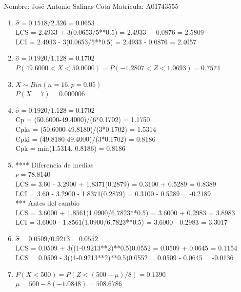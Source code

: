 \documentclass[8pt]{report}
\begin{document}
 \newpage

Nombre: \underline{\hspace*{.2in}}
José Antonio Salinas Cota
\underline{\hspace*{.2in}} \quad Matr\'icula:\underline{\hspace*{.2in}}
A01743555
\underline{\hspace*{.2in}} \\

\begin{enumerate}
\item $\hat\sigma = 0.1518/2.326 = 0.0653$\\
LCS = 2.4933 + 3(0.0653/5**0.5) = 2.4933 + 0.0876 = 2.5809\\
LCI = 2.4933 - 3(0.0653/5**0.5) = 2.4933 - 0.0876 = 2.4057
\item $\hat\sigma = 0.1920/1.128 = 0.1702$\\
$P(49.6000 < X < 50.0000) = P(-1.2807 < Z < 1.0693) = 0.7574$\\
\item $X \sim Bin(n=16, p=0.05)$\\
$P(X = 7) = 0.000006$
\item $\hat\sigma = 0.1920/1.128 = 0.1702$\\
Cp = (50.6000-49.4000)/(6*0.1702) = 1.1750\\
Cpks = (50.6000-49.8180)/(3*0.1702) = 1.5314\\
Cpki = (49.8180-49.4000)/(3*0.1702) = 0.8186\\
Cpk = min(1.5314, 0.8186) = 0.8186
\item **** Diferencia de medias\\
$\nu = 78.8140$\\
LCS = 3.60 - 3.2900 + 1.8371(0.2879) = 0.3100 + 0.5289 = 0.8389\\
LCI = 3.60 - 3.2900 - 1.8371(0.2879) = 0.3100 - 0.5289 = -0.2189\\
*** Antes del cambio\\
LCS = 3.6000 + 1.8561(1.0900/6.7823**0.5) = 3.6000 + 0.2983 = 3.8983\\
LCI = 3.6000 - 1.8561(1.0900/6.7823**0.5) = 3.6000 - 0.2983 = 3.3017\\
\item $\hat\sigma = 0.0509/0.9213 = 0.0552$\\
LCS = 0.0509 + 3((1-0.9213**2)**0.5)0.0552 = 0.0509 + 0.0645 = 0.1154\\
LCS = 0.0509 - 3((1-0.9213**2)**0.5)0.0552 = 0.0509 - 0.0645 = -0.0136
\item $P(X < 500) = P(Z < (500-\mu)/8) = 0.1390$\\
$\mu = 500 - 8(-1.0848) = 508.6786$\\
\end{enumerate}
\end{document}
